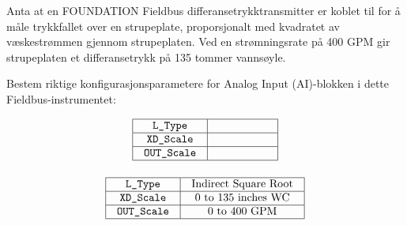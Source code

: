 

Anta at en FOUNDATION Fieldbus differansetrykktransmitter er koblet til for å måle trykkfallet over en strupeplate, proporsjonalt med kvadratet av væskestrømmen gjennom strupeplaten. Ved en strømningsrate på 400 GPM gir strupeplaten et differansetrykk på 135 tommer vannsøyle.

\vskip 10pt

Bestem riktige konfigurasjonsparametere for Analog Input (AI)-blokken i dette Fieldbus-instrumentet:


$$\vbox{\offinterlineskip
\halign{\strut
\vrule \quad\hfil # \ \hfil & 
\vrule \quad\hfil # \ \hfil \vrule \cr
\noalign{\hrule}
%
{\tt L\_Type} & \hskip 50pt \cr
%
\noalign{\hrule}
%
{\tt XD\_Scale} & \hskip 50pt \cr
%
\noalign{\hrule}
%
{\tt OUT\_Scale} & \hskip 50pt \cr
%
\noalign{\hrule}
} %
}$$ %








$$\vbox{\offinterlineskip
\halign{\strut
\vrule \quad\hfil # \ \hfil & 
\vrule \quad\hfil # \ \hfil \vrule \cr
\noalign{\hrule}
%
{\tt L\_Type} & Indirect Square Root \cr
%
\noalign{\hrule}
%
{\tt XD\_Scale} & 0 to 135 inches WC \cr
%
\noalign{\hrule}
%
{\tt OUT\_Scale} & 0 to 400 GPM \cr
%
\noalign{\hrule}
} %
}$$ %












